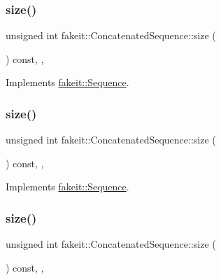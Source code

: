 \subsubsection{\texorpdfstring{size()}{size()}\hspace{0.1cm}{\footnotesize\ttfamily [5/9]}}
{\footnotesize\ttfamily unsigned int fakeit\+::\+Concatenated\+Sequence\+::size (\begin{DoxyParamCaption}{ }\end{DoxyParamCaption}) const\hspace{0.3cm}{\ttfamily [inline]}, {\ttfamily [override]}, {\ttfamily [virtual]}}



Implements \mbox{\hyperlink{classfakeit_1_1Sequence_aa9a45b45fc715148832a9dfb7b555556}{fakeit\+::\+Sequence}}.

\mbox{\label{classfakeit_1_1ConcatenatedSequence_aa1dba1b0274b30626ceab3a743c8105a}} 
\subsubsection{\texorpdfstring{size()}{size()}\hspace{0.1cm}{\footnotesize\ttfamily [6/9]}}
{\footnotesize\ttfamily unsigned int fakeit\+::\+Concatenated\+Sequence\+::size (\begin{DoxyParamCaption}{ }\end{DoxyParamCaption}) const\hspace{0.3cm}{\ttfamily [inline]}, {\ttfamily [override]}, {\ttfamily [virtual]}}



Implements \mbox{\hyperlink{classfakeit_1_1Sequence_aa9a45b45fc715148832a9dfb7b555556}{fakeit\+::\+Sequence}}.

\mbox{\label{classfakeit_1_1ConcatenatedSequence_aa1dba1b0274b30626ceab3a743c8105a}} 
\subsubsection{\texorpdfstring{size()}{size()}\hspace{0.1cm}{\footnotesize\ttfamily [7/9]}}
{\footnotesize\ttfamily unsigned int fakeit\+::\+Concatenated\+Sequence\+::size (\begin{DoxyParamCaption}{ }\end{DoxyParamCaption}) const\hspace{0.3cm}{\ttfamily [inline]}, {\ttfamily [override]}, {\ttfamily [virtual]}}



